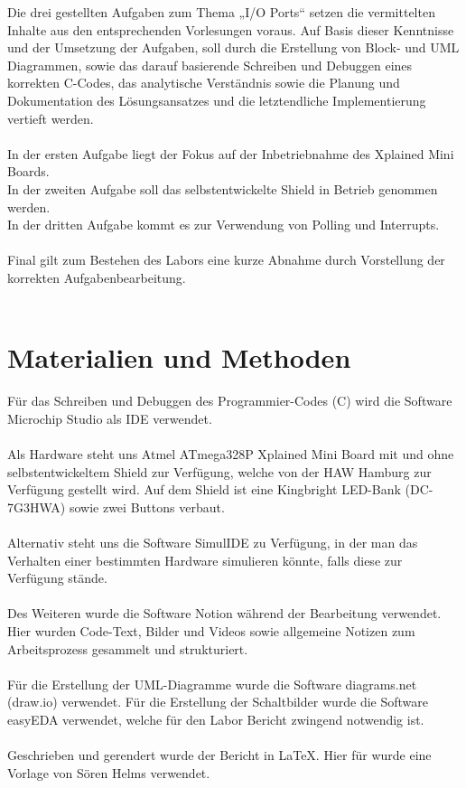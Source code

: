 \documentclass{article}
\begin{document}
\noindent Die drei gestellten Aufgaben zum Thema „I/O Ports“ setzen die vermittelten Inhalte aus den entsprechenden Vorlesungen voraus. Auf Basis dieser Kenntnisse und der Umsetzung der Aufgaben, soll durch die Erstellung von Block- und UML Diagrammen, sowie das darauf basierende Schreiben und Debuggen eines korrekten C-Codes, das analytische Verständnis sowie die Planung und Dokumentation des Lösungsansatzes und die letztendliche Implementierung vertieft werden. \\
\\
In der ersten Aufgabe liegt der Fokus auf der Inbetriebnahme des Xplained Mini Boards. \\
In der zweiten Aufgabe soll das selbstentwickelte Shield in Betrieb genommen werden. \\
In der dritten Aufgabe kommt es zur Verwendung von Polling und Interrupts. \\
\\
Final gilt zum Bestehen des Labors eine kurze Abnahme durch Vorstellung der korrekten Aufgabenbearbeitung. \\
\\

\section{Materialien und Methoden}

\noindent Für das Schreiben und Debuggen des Programmier-Codes (C) wird die Software Microchip Studio als IDE verwendet.  \\
\\
Als Hardware steht uns Atmel ATmega328P Xplained Mini Board mit und ohne selbstentwickeltem Shield zur Verfügung, welche von der HAW Hamburg zur Verfügung gestellt wird. 
Auf dem Shield ist eine Kingbright LED-Bank (DC-7G3HWA) sowie zwei Buttons verbaut. \\
\\
Alternativ steht uns die Software SimulIDE zu Verfügung, in der man das Verhalten einer bestimmten Hardware simulieren könnte, falls diese zur Verfügung stände.  \\
\\
Des Weiteren wurde die Software Notion während der Bearbeitung verwendet. Hier wurden Code-Text, Bilder und Videos sowie allgemeine Notizen zum Arbeitsprozess gesammelt und strukturiert. \\
\\
Für die Erstellung der UML-Diagramme wurde die Software diagrams.net (draw.io) verwendet.  
Für die Erstellung der Schaltbilder wurde die Software easyEDA verwendet, welche für den Labor Bericht zwingend notwendig ist.  \\
\\
Geschrieben und gerendert wurde der Bericht in LaTeX. Hier für wurde eine Vorlage von Sören Helms verwendet.\\
\end{document}
